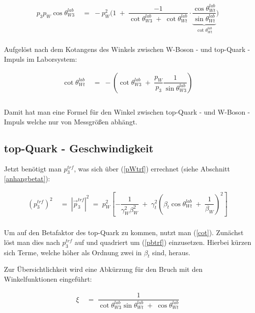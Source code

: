\documentclass[
a4paper,                                %
twoside,                                %
BCOR1.4cm,                      %
ngerman,                                %
10pt,                           %
headings=normal,                %
headsepline,                    %
clearplainpage, %
final,                                  %
div=14,
parskip=full
]{scrbook}
\begin{document}
\begin{align}
	p_{3} p_{W} \cos \theta_{W3}^{lab}
\;&=\;
	-p_{W}^{2}\bigg(
		1\;+\;
		\dfrac{-1}{\cot \theta_{W3}^{lab}\;+\;\cot \theta_{Wt}^{lab}}\cdot
		\underbrace{\dfrac{\cos \theta_{Wt}^{lab}}{\sin \theta_{Wt}^{lab}}}
		_{\cot \theta_{Wt}^{lab}}
	\bigg)
\nonumber
\\
\nonumber
\end{align}

Aufgel\"ost nach dem Kotangens des Winkels zwischen W-Boson - und top-Quark - Impuls im Laborsystem:

\begin{align}
	\cot \theta_{Wt}^{lab}
\;&=\;
	-\left(\cot \theta_{W3}^{lab}
	\;+\;\dfrac{p_{W}}{p_{3}}\dfrac{1}{\sin \theta_{W3}^{lab}}\right)
\label{cotthetaWtlab}
\\
\nonumber
\end{align}
\\
Damit hat man eine Formel f\"ur den Winkel zwischen top-Quark - und W-Boson - Impuls welche nur von Messgr\"o\ss en abh\"angt.

\subsection{top-Quark - Geschwindigkeit}

Jetzt ben\"otigt man $ p_{3}^{trf} $, was sich \"uber (\ref{pWtrf}) errechnet (siehe Abschnitt \ref{anhangbetat}):

\begin{align}
	\left(p_{3}^{trf}\right)^{2}
\;&=\;
	|\vec{p}_{3}^{trf}|^{2}
\;=\;
	p_{W}^{2} \left[
		-\dfrac{1}{\gamma_{W}^{2} \beta_{W}^{2}}
		\;+\;\gamma_{t}^{2} \left(
			\beta_{t} \cos \theta_{Wt}^{lab}
			\;+\;\dfrac{1}{\beta_{W}} 
		\right)^{2}
	\right]
\label{pbtrf}
\\
\nonumber
\end{align}

Um auf den Betafaktor des top-Quark zu kommen, nutzt man (\ref{cot}). Zun\"achst l\"ost man dies nach $ p_{3}^{trf} $ auf und quadriert um (\ref{pbtrf}) einzusetzen. Hierbei k\"urzen sich Terme, welche h\"oher als Ordnung zwei in $ \beta_{t} $ sind, heraus.

Zur \"Ubersichtlichkeit wird eine Abk\"urzung f\"ur den Bruch mit den Winkelfunktionen eingef\"uhrt:

\begin{align}
	\xi
\;&=\;
	\dfrac{1}
	{\cot \theta_{W3}^{lab} \sin \theta_{Wt}^{lab}\;+\;\cos \theta_{Wt}^{lab}}
\\
\nonumber
\end{align}
\end{document}
